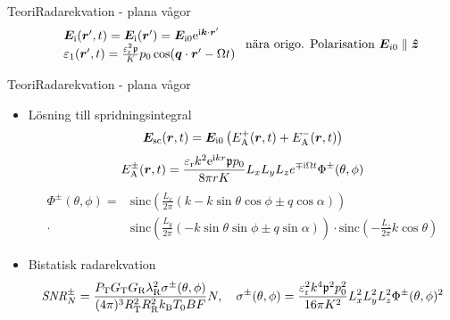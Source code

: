 \documentclass[11pt]{beamer}
\begin{document}
	\begin{frame}{Teori}{Radarekvation - plana vågor}
		\resizebox{!}{0.6\textheight}{
			
		}
		\pause
		\begin{equation*}
			\begin{array}{ll}
				&\bm{E}_{\mathrm{i}} (\bm{r}',t) = \bm{E}_{\mathrm{i}} (\bm{r}') = \bm{E}_{\mathrm{i}0} \mathrm{e}^{\mathrm{i} \bm{k}\cdot\bm{r}'} \\
				&\varepsilon_1 (\bm{r}',t) = \frac{\varepsilon_{\mathrm{r}}^2 \mathfrak{p}}{K} p_0 \cos(\bm{q} \cdot \bm{r}' - \Omega t)
			\end{array}
			\text{ nära origo. Polarisation } \bm{E}_{i0} \parallel \bm{\hat{z}}
		\end{equation*}
	\end{frame}
	
	\begin{frame}{Teori}{Radarekvation - plana vågor}
		\begin{itemize}
			\item Lösning till spridningsintegral
			\small
			\begin{equation*}
				\bm{E}_{\mathrm{sc}} (\bm{r},t) = \bm{E}_{\mathrm{i}0} \left( E_{\mathrm{A}}^+ (\bm{r},t) + E_{\mathrm{A}}^- (\bm{r},t) \right)
			\end{equation*}
			\pause
			\begin{equation*}
				E_{\mathrm{A}}^\pm (\bm{r},t) = \frac{\varepsilon_{\mathrm{r}}k^2 \mathrm{e}^{\mathrm{i} kr} \mathfrak{p} p_0}{8\pi r K} L_{x} L_{y} L_{z} e^{\mp \mathrm{i} \Omega t} \Phi^\pm (\theta,\phi)
			\end{equation*}
			\pause
			\begin{equation*}
			\begin{split}
				\Phi^\pm(\theta,\phi) =& \text{sinc} \left( \frac{L_{x}}{2\pi} \left( k - k\sin{\theta}\cos{\phi} \pm q\cos{\alpha} \right) \right) \\
				\cdot& \text{sinc} \left( \frac{L_{y}}{2\pi} \left( -k\sin{\theta}\sin{\phi} \pm q\sin{\alpha} \right) \right)
				\cdot \text{sinc} \left( -\frac{L_{z}}{2\pi} k\cos{\theta} \right)
			\end{split}
			\end{equation*}
			\pause
			\normalsize
			\item Bistatisk radarekvation
			\small
			\begin{equation*}
				\mathit{SNR}^\pm_N = \frac{P_{\mathrm{T}} G_{\mathrm{T}} G_{\mathrm{R}} \lambda_{\mathrm{R}}^2 \sigma^\pm (\theta,\phi)}{(4\pi)^3 R_{\mathrm{T}}^2 R_{\mathrm{R}}^2 k_{\mathrm{B}} T_0 B F} N, \quad
				\sigma^\pm (\theta, \phi) = \frac{\varepsilon_{\mathrm{r}}^2 k^4 \mathfrak{p}^2 p_0^2}{16\pi K^2} L_{x}^2 L_{y}^2 L_{z}^2 \Phi^\pm (\theta,\phi)^2
			\end{equation*}
		\end{itemize}
	\end{frame}
\end{document}
